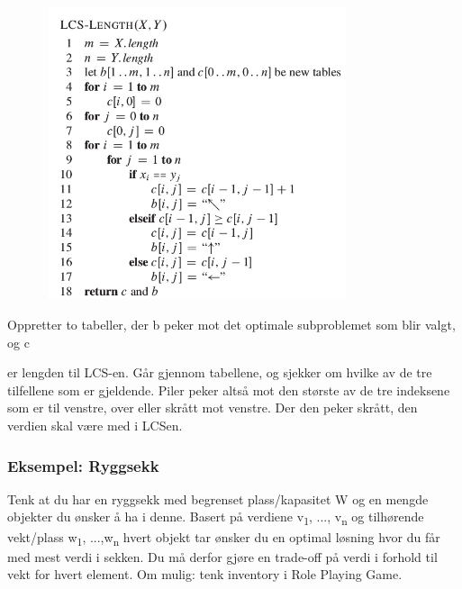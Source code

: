 \documentclass[12pt]{report}
\begin{document}

\begin{figure}[H]
	\begin{Center}
		\includegraphics[width=3.55in,height=3.38in]{./media/image56.png}
	\end{Center}
\end{figure}



\tab \par

\tab Oppretter to tabeller, der b peker mot det optimale subproblemet som blir valgt, og c \par

\begin{adjustwidth}{0.5in}{0.0in}
er lengden til LCS-en. Går gjennom tabellene, og sjekker om hvilke av de tre tilfellene som er gjeldende. Piler peker altså mot den største av de tre indeksene som er til venstre, over eller skrått mot venstre. Der den peker skrått, den verdien skal være med i LCSen. \par

\end{adjustwidth}


\vspace{\baselineskip}

\vspace{\baselineskip}
\setlength{\parskip}{6.0pt}

\vspace{\baselineskip}

\vspace{\baselineskip}\subsubsection*{Eksempel: Ryggsekk}
Tenk at du har en ryggsekk med begrenset plass/kapasitet W og en mengde objekter du ønsker å ha i denne. Basert på verdiene v\textsubscript{1}, ..., v\textsubscript{n} og tilhørende vekt/plass w\textsubscript{1}, ...,w\textsubscript{n} hvert objekt tar ønsker du en optimal løsning hvor du får med mest verdi i sekken. Du må derfor gjøre en trade-off på verdi i forhold til vekt for hvert element. Om mulig: tenk inventory i Role Playing Game.\par
\end{document}

